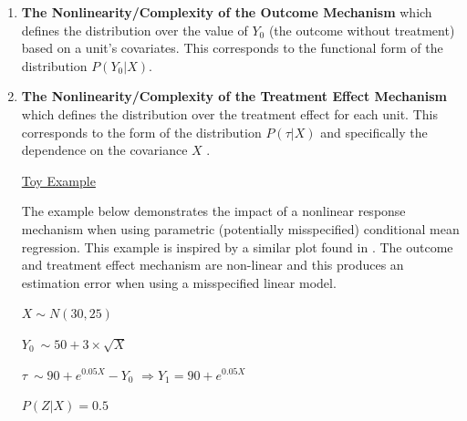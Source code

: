 \documentclass[../main.tex]{subfiles}
\begin{document}
\vspace{\baselineskip}
\begin{enumerate}
	\item \textbf{The Nonlinearity/Complexity of the Outcome Mechanism }which defines the distribution over the value of  \( Y_{0} \)  (the outcome without treatment) based on a unit’s covariates. This corresponds to the functional form of the distribution  \( P \left( Y_{0}  \vert  X \right)  \). \par


\vspace{\baselineskip}
	\item \textbf{The Nonlinearity/Complexity of the Treatment Effect Mechanism }which defines the distribution over the treatment effect for each unit. This corresponds to the form of the distribution  \( P \left(  \tau  \vert  X \right)  \)  and specifically the dependence on the covariance  \( X \) . \par


\vspace{\baselineskip}



\vspace{\baselineskip}
\uline{Toy Example}\par
\vspace{\baselineskip}
The example below demonstrates the impact of a nonlinear response mechanism when using parametric (potentially misspecified) conditional mean regression. This example is inspired by a similar plot found in \cite{Hill2011BayesianInference}. The outcome and treatment effect mechanism are non-linear and this produces an estimation error when using a misspecified linear model.\par


\vspace{\baselineskip}
 \( X\sim N\left( 30, 25 \right)  \) \par

 \( Y_{0}~\sim 50 + 3 \times \sqrt{X} \) \par

 \(  \tau~\sim90 + e^{0.05X} - Y_{0} \)  \(  \Rightarrow Y_{1}=90 + e^{0.05X}~ \) \par

 \( P \left( Z  \vert  X \right)  = 0.5 \) \par


\vspace{\baselineskip}


\end{enumerate}
\end{document}
